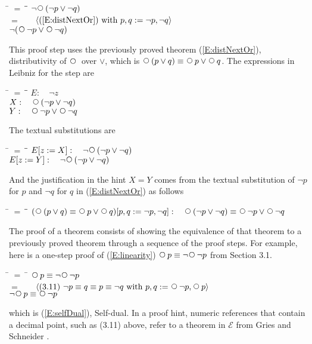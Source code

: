 \documentclass[fleqn, leqno]{article}
\newcommand{\lgap}{2pt}                             %
\newcommand{\mymathindent}{24pt}                    %
\newcommand{\Next}{\;\,\text{\raisebox{3.5pt}{\circle{6}}}}
\newcommand{\myqedtab}{\hspace{388.5pt}}              %
\newcommand{\Gll} {\langle}                         %
\newcommand{\Ggg} {\rangle}                         %
\newcommand{\Hint}[1]     {\ \ \ $\Gll              \mbox{#1} \Ggg$ }   %
\begin{document}
\begin{tabbing}
\hspace{\mymathindent} \= $= \;$ \= \myqedtab \= \kill
  \> \>   $\neg\Next (\neg p \lor \neg q)$\\[\lgap]
  \> $=$  \>  \Hint{(\ref{E:distNextOr}) with $p,q := \neg p, \neg q$}\\[\lgap]
  \> \>   $\neg (\Next\neg p \lor \Next \neg q)$
\end{tabbing}

This proof step uses the previously proved theorem (\ref{E:distNextOr}), distributivity of $\Next$ over $\lor$,
which is $\Next (p \lor q) \equiv \Next p \lor \Next q$.
The expressions in Leibniz for the step are

\begin{tabbing}
\hspace{\mymathindent} \= $= \;$ \= \myqedtab \= \kill
  \> $E:\quad \neg z$\\[\lgap]
  \> $X:\quad \Next (\neg p \lor \neg q)$\\[\lgap]
  \> $Y:\quad \Next \neg p \lor \Next \neg q$
\end{tabbing}

The textual substitutions are

\begin{tabbing}
\hspace{\mymathindent} \= $= \;$ \= \myqedtab \= \kill
  \> $E[z:=X]:\quad \neg\Next (\neg p \lor \neg q)$\\[\lgap]
  \> $E[z:=Y]:\quad \neg\Next (\neg p \lor \neg q)$
\end{tabbing}

And the justification in the hint $X=Y$ comes from the textual substitution of $\neg p$ for $p$
and $\neg q$ for $q$ in (\ref{E:distNextOr}) as follows

\begin{tabbing}
\hspace{\mymathindent} \= $= \;$ \= \myqedtab \= \kill
  \> $(\Next (p \lor q) \equiv \Next p \lor \Next q)[p,q:=\neg p, \neg q]:\quad
      \Next (\neg p \lor \neg q) \equiv \Next \neg p \lor \Next \neg q$
\end{tabbing}

The proof of a theorem consists of showing the equivalence of that theorem to a previously proved theorem
through a sequence of the proof steps.
For example, here is a one-step proof of (\ref{E:linearity}) $\Next p \equiv \neg\Next\neg p$ from Section 3.1.

\begin{tabbing}
\hspace{\mymathindent} \= $= \;$ \= \kill
  \> \>   $\Next p \equiv \neg\Next\neg p$\\[\lgap]
  \> $=$  \>  \Hint{(3.11) $\neg p \equiv q \equiv p \equiv \neg q$ with $p,q := \Next\neg p, \Next p$} \\[\lgap]
  \> \>   $\neg\Next p \equiv \Next\neg p$
\end{tabbing}
which is (\ref{E:selfDual}), Self-dual.
In a proof hint, numeric references that contain a decimal point, such as (3.11) above, refer to a theorem in $\mathcal{E}$ from Gries and Schneider \cite{LADM}.\\
\end{document}
